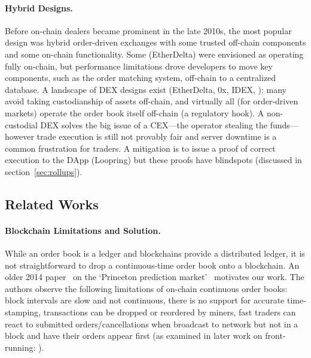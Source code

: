 \paragraph{Hybrid Designs.} Before on-chain dealers became prominent in the late 2010s, the most popular design was hybrid order-driven exchanges with some trusted off-chain components and some on-chain functionality. Some (\eg EtherDelta) were envisioned as operating fully on-chain, but performance limitations drove developers to move key components, such as the order matching system, off-chain to a centralized database. A landscape of DEX designs exist (\eg EtherDelta, 0x, IDEX, \etc): many avoid taking custodianship of assets off-chain, and virtually all (for order-driven markets) operate the order book itself off-chain (a regulatory hook). A non-custodial DEX solves the big issue of a CEX---the operator stealing the funds---however trade execution is still not provably fair and server downtime is a common frustration for traders. A mitigation is to issue a proof of correct execution to the DApp (\eg Loopring) but these proofs have blindspots (discussed in section~\ref{sec:rollups}). 

\subsection{Related Works}

\paragraph{Blockchain Limitations and Solution.} While an order book is a ledger and blockchains provide a distributed ledger, it is not straightforward to drop a continuous-time order book onto a blockchain. An older 2014 paper~\cite{clark2014decentralizing} on the `Princeton prediction market'~\cite{Bra13} motivates our work. The authors observe the following limitations of on-chain continuous order books: block intervals are slow and not continuous, there is no support for accurate time-stamping, transactions can be dropped or reordered by miners, fast traders can react to submitted orders/cancellations when broadcast to network but not in a block and have their orders appear first (as examined in later work on front-running: \cite{eskandari2019sok,daian2019flash}).

